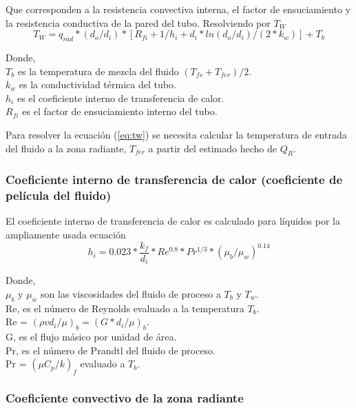 \par Que corresponden a la resistencia convectiva interna, el factor de ensuciamiento y la resistencia conductiva de la pared del tubo. Resolviendo por $T_W$
\begin{equation}
\label{eq:tw}
T_W = q_{rad} *(d_o/d_i) *[ R_{fi} + 1/h_i + d_i*ln(d_o/d_i)/(2*k_w) ] +T_b
\end{equation}

\par Donde,\\
$T_b$ es la temperatura de mezcla del fluido $(T_{fs} + T_{fer})/2$. \\
$k_w$ es la conductividad térmica del tubo. \\
$h_i$ es el coeficiente interno de transferencia de calor. \\
$R_{fi}$ es el factor de ensuciamiento interno del tubo. \\

\par Para resolver la ecuación (\ref{eq:tw}) se necesita calcular la temperatura de entrada del fluido a la zona radiante, $T_{fer}$ a partir del estimado hecho de $Q_R$. 

\subsubsection{Coeficiente interno de transferencia de calor (coeficiente de película del fluido)}

\par El coeficiente interno de transferencia de calor es calculado para líquidos por la ampliamente usada ecuación
\begin{equation}
\label{eq:hi}
 h_i = 0.023 * \frac{k_f}{d_i} *Re^{0.8} *Pr^{1/3} *(\mu_b /\mu_w )^{0.14}
\end{equation}
\par Donde,\\
$\mu_b$ y $\mu_w$ son las viscosidades del fluido de proceso a $T_b$ y $T_w$. \\
Re, es el número de Reynolds evaluado a la temperatura $T_b$. \\
Re = $(\rho v d_i / \mu)_b = (G *d_i / \mu)_b$. \\
G, es el flujo másico por unidad de área. \\
Pr, es el número de Prandtl del fluido de proceso. \\
Pr = $(\mu C_p / k)_f$ evaluado a $T_b$.

\subsubsection{Coeficiente convectivo de la zona radiante}

